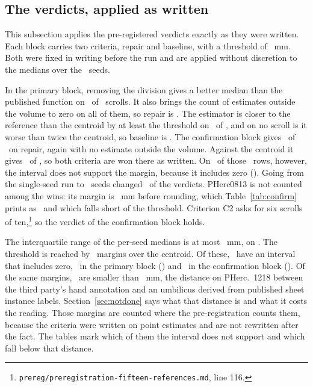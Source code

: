 \subsection{The verdicts, applied as written}

This subsection applies the pre-registered verdicts exactly as they were written. Each block
carries two criteria, repair and baseline, with a threshold of \UmbThresholdMm~mm. Both were fixed
in writing before the run and are applied without discretion to the medians over the \RevKSeeds\
seeds.

In the primary block, removing the division gives a better median than the published function on
\RevKPrimaryRepaired\ of \RevKPrimaryScrolls\ scrolls. It also brings the count of estimates
outside the volume to zero on all of them, so repair is \RevKPrimaryRepairVerdict. The estimator is
closer to the reference than the centroid by at least the threshold on \RevKPrimaryBeats\ of
\RevKPrimaryScrolls, and on no scroll is it worse than twice the centroid, so baseline is
\RevKPrimaryBeatVerdict. The confirmation block gives \RevKConfirmRepaired\ of
\RevKConfirmScrolls\ on repair, again with no estimate outside the volume. Against the centroid it
gives \RevKConfirmBeats\ of \RevKConfirmScrolls, so both criteria are won there as written. On
\RevKConfirmZeroMargins\ of those \RevKConfirmBeats\ rows, however, the interval does not support
the margin, because it includes zero (\RevKConfirmZeroMarginScrolls). Going from the single-seed run
to \RevKSeeds\ seeds changed \RevKVerdictsChanged\ of the verdicts. PHerc0813 is not counted among the
wins: its margin is \RevKZeroEightOneThreeMarginUnrounded~mm before rounding, which Table~\ref{tab:confirm}
prints as \RevKZeroEightOneThreeMargin\ and which falls short of the threshold. Criterion C2 asks for six scrolls of
ten,\footnote{\texttt{prereg/preregistration-fifteen-references.md}, line 116.} so the verdict of
the confirmation block holds.

The interquartile range of the per-seed medians is at most \RevKMaxIqr~mm, on \RevKMaxIqrScroll.
The threshold is reached by \RevKWonTotal\ margins over the centroid. Of these,
\RevKZeroMarginsTotal\ have an interval that includes zero, \RevKPrimaryZeroMargins\ in the primary
block (\RevKPrimaryZeroMarginScrolls) and \RevKConfirmZeroMargins\ in the confirmation block
(\RevKConfirmZeroMarginScrolls). Of the same margins, \RevKUnderSpreadTotal\ are smaller than
\UmbReferenceSpread~mm, the distance on PHerc.\ 1218 between the third party's hand annotation and
an umbilicus derived from published sheet instance labels. Section~\ref{sec:notdone} says what that
distance is and what it costs the reading. Those margins are counted where the pre-registration
counts them, because the criteria were written on point estimates and are not rewritten after the
fact. The tables mark which of them the interval does not support and which fall below that
distance.

